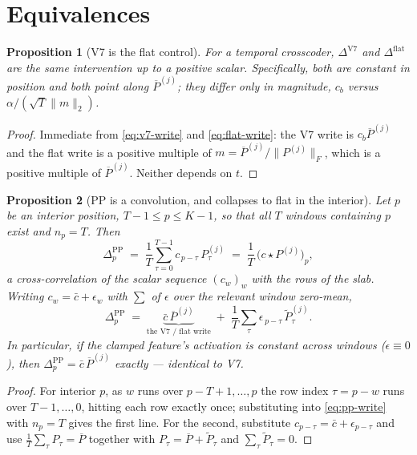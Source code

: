 \documentclass[11pt]{article}
\newtheorem{proposition}{Proposition}
\theoremstyle{definition}
\newcommand{\slab}{P}
\newcommand{\dc}{\overline{\slab}}
\newcommand{\ac}{\widetilde{\slab}}
\begin{document}
\section{Equivalences}

\begin{proposition}[V7 is the flat control]
\label{prop:v7-flat}
For a temporal crosscoder, $\Delta^{\mathrm{V7}}$ and $\Delta^{\mathrm{flat}}$ are the same
intervention up to a positive scalar. Specifically, both are constant in position and both point
along $\dc^{(j)}$; they differ only in magnitude, $c_b$ versus
$\alpha/(\sqrt{T}\lVert m\rVert_2)$.
\end{proposition}

\begin{proof}
Immediate from \eqref{eq:v7-write} and \eqref{eq:flat-write}: the V7 write is $c_b\dc^{(j)}$ and
the flat write is a positive multiple of $m = \dc^{(j)}/\lVert\slab^{(j)}\rVert_F$, which is a
positive multiple of $\dc^{(j)}$. Neither depends on $t$.
\end{proof}

\begin{proposition}[PP is a convolution, and collapses to flat in the interior]
\label{prop:pp}
Let $p$ be an interior position, $T-1\le p\le K-1$, so that all $T$ windows containing $p$ exist
and $n_p = T$. Then
\begin{equation}
  \Delta^{\mathrm{PP}}_p \;=\; \frac1T\sum_{\tau=0}^{T-1} c_{\,p-\tau}\,\slab^{(j)}_{\tau}
  \;=\; \frac1T\,\bigl(c \star \slab^{(j)}\bigr)_p ,
\end{equation}
a cross-correlation of the scalar sequence $(c_w)_w$ with the rows of the slab. Writing
$c_w = \bar c + \epsilon_w$ with $\sum$ of $\epsilon$ over the relevant window zero-mean,
\begin{equation}
  \Delta^{\mathrm{PP}}_p \;=\; \underbrace{\bar c\,\dc^{(j)}}_{\text{the V7 / flat write}}
  \;+\; \frac1T\sum_{\tau} \epsilon_{\,p-\tau}\,\ac^{(j)}_{\tau}.
  \label{eq:pp-decomp}
\end{equation}
In particular, if the clamped feature's activation is constant across windows ($\epsilon\equiv 0$),
then $\Delta^{\mathrm{PP}}_p = \bar c\,\dc^{(j)}$ exactly --- identical to V7.
\end{proposition}

\begin{proof}
For interior $p$, as $w$ runs over $p-T+1,\dots,p$ the row index $\tau = p-w$ runs over
$T-1,\dots,0$, hitting each row exactly once; substituting into \eqref{eq:pp-write} with
$n_p=T$ gives the first line. For the second, substitute $c_{p-\tau} = \bar c + \epsilon_{p-\tau}$
and use $\tfrac1T\sum_\tau \slab_\tau = \dc$ together with
$\slab_\tau = \dc + \ac_\tau$ and $\sum_\tau \ac_\tau = 0$.
\end{proof}
\end{document}
